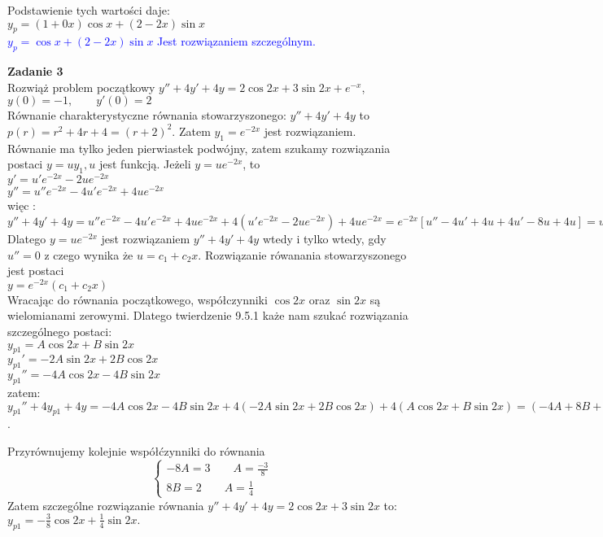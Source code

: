 \documentclass[10pt,a4paper]{article}
\begin{document}
	Podstawienie tych wartości daje: \\
	$y_{p} = (1 + 0x)\cos x + (2-2x)\sin x $ \\
	\textcolor{blue}{$y_{p} = \cos x + (2-2x)\sin x $  Jest rozwiązaniem szczególnym. } \\
    \newpage
    
    \textbf{Zadanie 3} \\
    Rozwiąż problem początkowy 
    $y'' +4y' + 4y = 2\cos 2x + 3\sin 2x + e^{-x}$, \\$ y(0) = -1, \qquad y'(0) = 2$ \\
    Równanie charakterystyczne równania stowarzyszonego: $y'' +4y' + 4y $ to\\
    $p(r) = r^2 + 4r + 4 = (r+2)^2$. Zatem $ y_{1} = e^{-2x}$ jest rozwiązaniem. \\
    
    Równanie ma tylko jeden pierwiastek podwójny, zatem szukamy rozwiązania postaci $ y = uy_{1}, u $ jest funkcją.
    Jeżeli $y = ue^{-2x}$, to \\
    $y' = u'e^{-2x} -2ue^{-2x}$ \\
    $y'' = u''e^{-2x} -4u'e^{-2x} + 4ue^{-2x} $\\
    więc :
    $y'' +4y' + 4y = u''e^{-2x} -4u'e^{-2x} + 4ue^{-2x} + 4(u'e^{-2x} -2ue^{-2x}) + 4ue^{-2x} = e^{-2x}[u'' - 4u' + 4u + 4u' - 8u + 4u] = u''e^{-2x}$ \\
    
    Dlatego $y = ue^{-2x} $ jest rozwiązaniem $y'' +4y' + 4y $ wtedy i tylko wtedy, gdy $u''=0$ z czego wynika że $u = c_{1} + c_{2}x$. Rozwiązanie rówanania stowarzyszonego jest postaci \\
    $y= e^{-2x}(c_{1}+ c_{2}x)$ \\
    
    Wracając do równania początkowego, współczynniki $\cos 2x$ oraz $\sin 2x$ są wielomianami zerowymi. Dlatego twierdzenie 9.5.1 każe nam szukać rozwiązania szczególnego postaci:\\
    $y_{p1} = A \cos 2x + B \sin 2x $ \\
    $y_{p1}' = -2A \sin 2x + 2B \cos 2x $ \\
    $y_{p1}'' = -4A \cos 2x -4B \sin 2x $ \\
    zatem: $y_{p1}'' + 4y_{p1} + 4y = -4A \cos 2x -4B \sin 2x + 4(-2A \sin 2x + 2B \cos 2x ) + 4(A \cos 2x + B \sin 2x ) = (-4A + 8B + 4A)\cos 2x + (-4B -8A  + 4B)\sin 2x = -8 \sin 2x + 8B \cos 2x$.
    
    Przyrównujemy kolejnie współćzynniki do równania \\
    	$$ 
    \left\{ \begin{array}{l}
    -8A = 3 \qquad A=\frac{-3}{8}\\
    8B = 2 \qquad A=\frac{1}{4}
    \end{array}\right.
    $$
    Zatem szczególne rozwiązanie równania  $y'' +4y' + 4y = 2\cos 2x + 3\sin 2x $ to: \\
    $y_{p1}= -\frac{3}{8}\cos 2x + \frac{1}{4} \sin 2x. $\\
     
\end{document}
